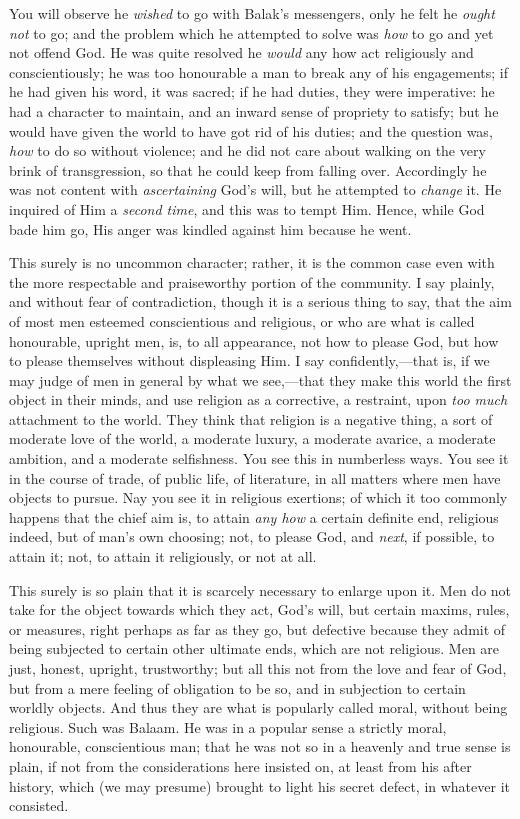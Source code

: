 You will observe he \emph{wished} to go with Balak's messengers,
only he felt he \emph{ought not} to go; and the problem which he
attempted to solve was \emph{how} to go and yet not offend God. He was
quite resolved he \emph{would} any how act religiously and
conscientiously; he was too honourable a man to break any of his
engagements; if he had given his word, it was sacred; if he had
duties, they were imperative: he had a character to maintain, and an
inward sense of propriety to satisfy; but he would have given the
world to have got rid of his duties; and the question was, \emph{how}
to do so without violence; and he did not care about walking on the
very brink of transgression, so that he could keep from falling over.
Accordingly he was not content with \emph{ascertaining} God's will,
but he attempted to \emph{change} it. He inquired of Him a \emph{second
time}, and this was to tempt Him. Hence, while God bade him go, His
anger was kindled against him because he went.

This surely is no uncommon character; rather, it is the common case
even with the more respectable and praiseworthy portion of the
community. I say plainly, and without fear of contradiction, though it
is a serious thing to say, that the aim of most men esteemed
conscientious and religious, or who are what is called honourable,
upright men, is, to all appearance, not how to please God, but how to
please themselves without displeasing Him. I say confidently,—that
is, if we may judge of men in general by what we see,—that they make
this world the first object in their minds, and use religion as a
corrective, a restraint, upon \emph{too much} attachment to the world.
They think that religion is a negative thing, a sort of moderate love
of the world, a moderate luxury, a moderate avarice, a moderate
ambition, and a moderate selfishness. You see this in numberless ways.
You see it in the course of trade, of public life, of literature, in
all matters where men have objects to pursue. Nay you see it in
religious exertions; of which it too commonly happens that the chief
aim is, to attain \emph{any how} a certain definite end, religious
indeed, but of man's own choosing; not, to please God, and \emph{next},
if possible, to attain it; not, to attain it religiously, or not at
all.

This surely is so plain that it is scarcely necessary to enlarge
upon it. Men do not take for the object towards which they act, God's
will, but certain maxims, rules, or measures, right perhaps as far as
they go, but defective because they admit of being subjected to
certain other ultimate ends, which are not religious. Men are just,
honest, upright, trustworthy; but all this not from the love and fear
of God, but from a mere feeling of obligation to be so, and in
subjection to certain worldly objects. And thus they are what is
popularly called moral, without being religious. Such was Balaam. He
was in a popular sense a strictly moral, honourable, conscientious
man; that he was not so in a heavenly and true sense is plain, if not
from the considerations here insisted on, at least from his after
history, which (we may presume) brought to light his secret defect, in
whatever it consisted.

